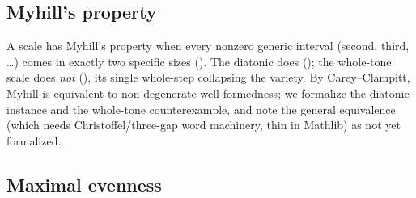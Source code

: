 \subsection{Myhill's property}\label{sec:p3-myhill}


A scale has Myhill's property when every nonzero generic interval (second, third, \dots) comes in
exactly two specific sizes (). The diatonic does (); the
whole-tone scale does \emph{not} (), its single whole-step
collapsing the variety. By Carey--Clampitt, Myhill is equivalent to non-degenerate
well-formedness; we formalize the diatonic instance and the whole-tone counterexample, and note the
general equivalence (which needs Christoffel/three-gap word machinery, thin in Mathlib) as not yet
formalized.

\subsection{Maximal evenness}\label{sec:p3-me}


